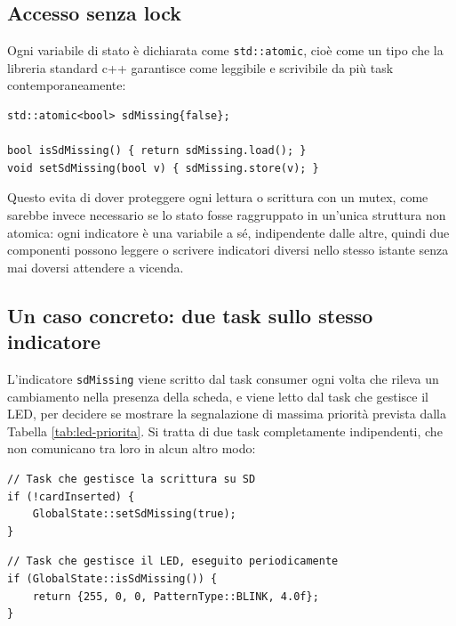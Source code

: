 \subsection{Accesso senza lock}
Ogni variabile di stato è dichiarata come \texttt{std::atomic}, cioè come un
tipo che la libreria standard c++ garantisce come leggibile e scrivibile da più task
contemporaneamente:

\begin{listing}[H]
\begin{verbatim}
std::atomic<bool> sdMissing{false};

bool isSdMissing() { return sdMissing.load(); }
void setSdMissing(bool v) { sdMissing.store(v); }
\end{verbatim}
\caption{Un indicatore come variabile atomica}
\label{listing:atomic-indicator}
\end{listing}

Questo evita di dover proteggere ogni lettura o scrittura con un mutex, come
sarebbe invece necessario se lo stato fosse raggruppato in un'unica struttura
non atomica: ogni indicatore è una variabile a sé, indipendente dalle altre,
quindi due componenti possono leggere o scrivere indicatori diversi nello
stesso istante senza mai doversi attendere a vicenda.

\subsection{Un caso concreto: due task sullo stesso indicatore}
L'indicatore \texttt{sdMissing} viene scritto dal task consumer ogni volta che 
rileva un cambiamento nella presenza della scheda, e viene letto dal task che 
gestisce il LED, per decidere se mostrare
la segnalazione di massima priorità prevista dalla
Tabella \ref{tab:led-priorita}. Si tratta di due task completamente
indipendenti, che non comunicano tra loro in alcun altro modo:

\begin{listing}[H]
\begin{verbatim}
// Task che gestisce la scrittura su SD
if (!cardInserted) {
    GlobalState::setSdMissing(true);
}
\end{verbatim}
\caption{Scrittura dell'indicatore da parte del task consumer}
\label{listing:sdmissing-writer}
\end{listing}

\begin{listing}[H]
\begin{verbatim}
// Task che gestisce il LED, eseguito periodicamente
if (GlobalState::isSdMissing()) {
    return {255, 0, 0, PatternType::BLINK, 4.0f};
}
\end{verbatim}
\caption{Lettura dello stesso indicatore da parte del task LED}
\label{listing:sdmissing-reader}
\end{listing}

